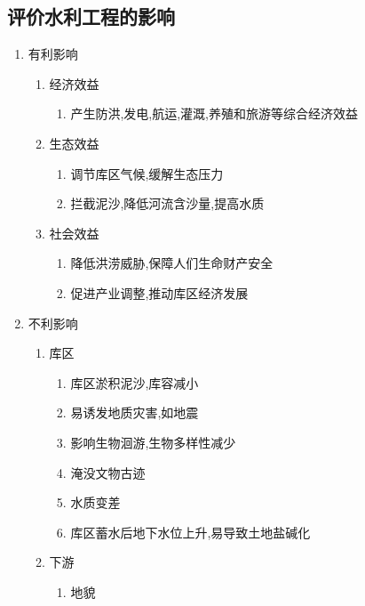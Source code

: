 \documentclass[a4paper]{article}
\begin{document}
    \subsection{评价水利工程的影响}
    \begin{enumerate}
        \item 有利影响
        \begin{enumerate}
            \item 经济效益
            \begin{enumerate}
                \item 产生防洪,发电,航运,灌溉,养殖和旅游等综合经济效益
            \end{enumerate}
            \item 生态效益
            \begin{enumerate}
                \item 调节库区气候,缓解生态压力 %
                \item 拦截泥沙,降低河流含沙量,提高水质
            \end{enumerate}
            \item 社会效益
            \begin{enumerate}
                \item 降低洪涝威胁,保障人们生命财产安全
                \item 促进产业调整,推动库区经济发展
            \end{enumerate}
        \end{enumerate}
        \item 不利影响
        \begin{enumerate}
            \item 库区
            \begin{enumerate}
                \item 库区淤积泥沙,库容减小 %
                \item 易诱发地质灾害,如地震
                \item 影响生物洄游,生物多样性减少 %
                \item 淹没文物古迹
                \item 水质变差
                \item 库区蓄水后地下水位上升,易导致土地盐碱化 %
            \end{enumerate}
            \item 下游
            \begin{enumerate}
                \item 地貌

\end{enumerate}
\end{enumerate}
\end{enumerate}
\end{document}
